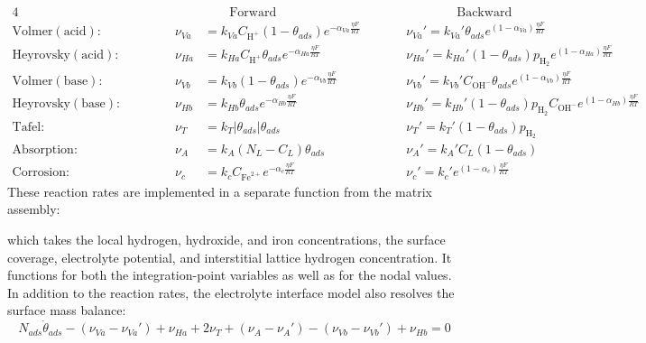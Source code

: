 \documentclass[3p]{elsarticle} %
\begin{document}
\begin{alignat}{4}
\nonumber && && & \qquad\mathrm{Forward} &&  \qquad\qquad \mathrm{Backward} \\
    \mathrm{Volmer (acid):} && \quad && \nu_{Va} &= k_{Va} C_{\mathrm{H}^+}(1-\theta_{ads})e^{-\alpha_{Va} \frac{\eta F}{RT}}\qquad
    && \nu_{Va}' = k_{Va}' \theta_{ads}e^{(1-\alpha_{Va}) \frac{\eta F}{RT}} \label{eq:react1}\\
    \mathrm{Heyrovsky (acid):} && && \nu_{Ha} &= k_{Ha} C_{\mathrm{H}^+}\theta_{ads}e^{-\alpha_{Ha} \frac{\eta F}{RT}}\qquad
    && \nu_{Ha}' = k_{Ha}' (1-\theta_{ads}) p_{\mathrm{H}_2} e^{(1-\alpha_{Ha}) \frac{\eta F}{RT}} \label{eq:react2}\\
    \mathrm{Volmer (base):} && && \nu_{Vb} &= k_{Vb} (1-\theta_{ads})e^{-\alpha_{Vb} \frac{\eta F}{RT}}\qquad
    && \nu_{Vb}' = k_{Vb}' C_{\mathrm{OH}^-} \theta_{ads}e^{(1-\alpha_{Vb}) \frac{\eta F}{RT}} \label{eq:react5}\\
    \mathrm{Heyrovsky (base):} && && \nu_{Hb} &= k_{Hb} \theta_{ads}e^{-\alpha_{Hb} \frac{\eta F}{RT}}\qquad
    && \nu_{Hb}' = k_{Hb}' (1-\theta_{ads}) p_{\mathrm{H}_2} C_{\mathrm{OH}^-} e^{(1-\alpha_{Hb}) \frac{\eta F}{RT}}  \label{eq:react6}\\
    \mathrm{Tafel:} && && \nu_T &= k_T\left|\theta_{ads}\right|\theta_{ads}\qquad
    && \nu_T' = k_T' (1-\theta_{ads})p_{\mathrm{H}_2} \label{eq:react3}\\
    \mathrm{Absorption:} && && \nu_A &= k_A (N_L - C_L)\theta_{ads}\qquad
    && \nu_A' = k_A' C_L (1-\theta_{ads}) \label{eq:react4}\\
    \mathrm{Corrosion:} && && \nu_{c} &= k_{c} C_{\mathrm{Fe}^{2+}}e^{-\alpha_{c} \frac{\eta F}{RT}} \qquad && \nu_{c}' = k_{c}' e^{(1-\alpha_{c}) \frac{\eta F}{RT}}   \label{eq:react7}
\end{alignat}
These reaction rates are implemented in a separate function from the matrix assembly:

which takes the local hydrogen, hydroxide, and iron concentrations, the surface coverage, electrolyte potential, and interstitial lattice hydrogen concentration. It functions for both the integration-point variables as well as for the nodal values. In addition to the reaction rates, the electrolyte interface model also resolves the surface mass balance:
\begin{equation}
    N_{ads} \dot{\theta}_{ads} - (\nu_{Va}-\nu_{Va}') + \nu_{Ha} + 2 \nu_T + (\nu_A-\nu_A') - (\nu_{Vb}-\nu_{Vb}') + \nu_{Hb} = 0
\end{equation}
\end{document}
